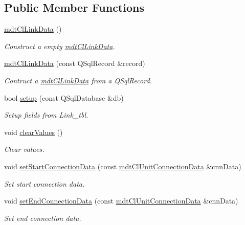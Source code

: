 \subsection*{Public Member Functions}
\begin{DoxyCompactItemize}
\item 
\hyperlink{classmdt_cl_link_data_a43587d0adedeaa563bff5c7d98ffeb0e}{mdt\-Cl\-Link\-Data} ()
\begin{DoxyCompactList}\small\item\em Construct a empty \hyperlink{classmdt_cl_link_data}{mdt\-Cl\-Link\-Data}. \end{DoxyCompactList}\item 
\hyperlink{classmdt_cl_link_data_a654881d20f94810391926752112a775a}{mdt\-Cl\-Link\-Data} (const Q\-Sql\-Record \&record)
\begin{DoxyCompactList}\small\item\em Contruct a \hyperlink{classmdt_cl_link_data}{mdt\-Cl\-Link\-Data} from a Q\-Sql\-Record. \end{DoxyCompactList}\item 
bool \hyperlink{classmdt_cl_link_data_aea3186af58d6718f510e1fe509c6ffe4}{setup} (const Q\-Sql\-Database \&db)
\begin{DoxyCompactList}\small\item\em Setup fields from Link\-\_\-tbl. \end{DoxyCompactList}\item 
void \hyperlink{classmdt_cl_link_data_ae9505b7ba0d120d9c42e8fff20fe6ec7}{clear\-Values} ()
\begin{DoxyCompactList}\small\item\em Clear values. \end{DoxyCompactList}\item 
void \hyperlink{classmdt_cl_link_data_a3f7d2e28043cf19aaa2d8cd3e15d4fe3}{set\-Start\-Connection\-Data} (const \hyperlink{classmdt_cl_unit_connection_data}{mdt\-Cl\-Unit\-Connection\-Data} \&cnn\-Data)
\begin{DoxyCompactList}\small\item\em Set start connection data. \end{DoxyCompactList}\item 
void \hyperlink{classmdt_cl_link_data_ab693d2c53b3b0aa7d6f34b857078cb80}{set\-End\-Connection\-Data} (const \hyperlink{classmdt_cl_unit_connection_data}{mdt\-Cl\-Unit\-Connection\-Data} \&cnn\-Data)
\begin{DoxyCompactList}\small\item\em Set end connection data. \end{DoxyCompactList}\item 

\end{DoxyCompactItemize}
